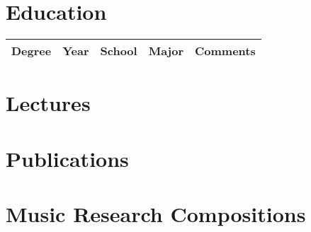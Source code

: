 \documentclass{ResumeDesignFormat1}
\begin{document}
\section{Education}

\begin{enumerate}
\end{enumerate}


\begin{table}[H]
\small
\centering
\begin{tabular}{p{1cm}p{1cm}p{1cm}p{1cm}}
 \hline
 Degree & Year & School & Major & Comments \\ 
 \hline

 \hline
\end{tabular}
\end{table}

\section{Lectures}

\begin{enumerate}
\end{enumerate}
\section{Publications}

\begin{enumerate}
\end{enumerate}
\section{Music Research Compositions}

\begin{enumerate}
\end{enumerate}
\end{document}

